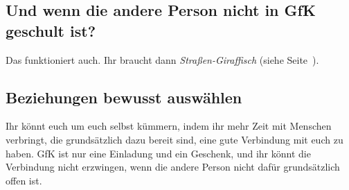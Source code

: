 \subsection{Und wenn die andere Person nicht in GfK geschult ist?}

Das funktioniert auch. Ihr braucht dann \emph{Straßen-Giraffisch} (siehe Seite~\pageref{strassengiraffisch}).

\subsection{Beziehungen bewusst auswählen}

Ihr könnt euch um euch selbst kümmern, indem ihr mehr Zeit mit Menschen verbringt, die grundsätzlich dazu bereit sind, eine gute Verbindung mit euch zu haben. GfK ist nur eine Einladung und ein Geschenk, und ihr könnt die Verbindung nicht erzwingen, wenn die andere Person nicht dafür grundsätzlich offen ist.

